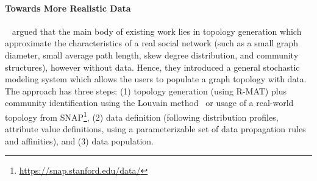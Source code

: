 
\paragraph{Towards More Realistic Data} ~\cite{Nettleton2016} argued that the main body of existing work lies in
topology generation which approximate the characteristics of a real social
network (such as a small graph diameter, small average path length, skew degree
distribution, and community structures), however without data. Hence, they
introduced a general stochastic modeling system which allows the users to
populate a graph topology with data. The approach has three steps: (1) topology
generation (using R-MAT) plus community identification using the Louvain
method~\cite{1742-5468-2008-10-P10008} or usage of a real-world topology from
SNAP\footnote{\url{https://snap.stanford.edu/data/}}, (2) data definition
(following distribution profiles, attribute value definitions, using a
parameterizable set of data propagation rules and affinities), and (3) data
population.


